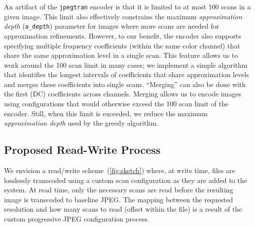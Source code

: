 

An artifact of the \texttt{jpegtran} encoder is that it is limited to at most 100 scans in a given image.
This limit also effectively constrains the maximum \emph{approximation depth} (\texttt{a\_depth}) parameter for images where more scans are needed for approximation refinements. 
However, to our benefit, the encoder also supports specifying multiple frequency coefficients (within the same color channel) that share the same approximation level in a single scan.
This feature allows us to work around the 100 scan limit in many cases; we implement a simple algorithm that identifies the longest intervals of coefficients that share approximation levels and merges these coefficients into single scans.
``Merging'' can also be done with the first (DC) coefficients across channels.
Merging allows us to encode images using configurations that would otherwise exceed the 100 scan limit of the encoder.
Still, when this limit is exceeded, we reduce the maximum \emph{approximation depth} used by the greedy algorithm.


\subsection{Proposed Read-Write Process}
We envision a read/write scheme~(\autoref{fig:sketch}) where, at write time, files are losslessly transcoded using a custom scan configuration as they are added to the system.
At read time, only the necessary scans are read before the resulting image is transcoded to baseline JPEG\@.
The mapping between the requested resolution and how many scans to read (offset within the file) is a result of the custom progressive JPEG configuration process.

